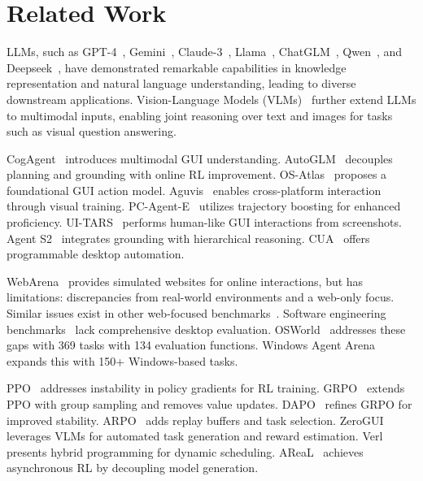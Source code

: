 \clearpage
\section{Related Work}

LLMs, such as GPT-4~\citep{achiam2023gpt}, Gemini~\citep{team2023gemini}, Claude-3~\citep{claude2}, Llama~\citep{touvron2023llama}, ChatGLM~\citep{zeng2022glm,du2022glm}, Qwen~\citep{bai2023qwen,team2024qwen2}, and Deepseek~\citep{liu2024deepseek,guo2025deepseek}, have demonstrated remarkable capabilities in knowledge representation and natural language understanding, leading to diverse downstream applications.
Vision-Language Models (VLMs)~\citep{hong2023cogagent,hong2025glm,bai2023qwen-vl,hurst2024gpt} further extend LLMs to multimodal inputs, enabling joint reasoning over text and images for tasks such as visual question answering.

CogAgent~\citep{hong2023cogagent} introduces multimodal GUI understanding. AutoGLM~\citep{liu2024autoglm} decouples planning and grounding with online RL improvement. OS-Atlas~\citep{wu2024atlas} proposes a foundational GUI action model. Aguvis~\citep{xu2024aguvis} enables cross-platform interaction through visual training. PC-Agent-E~\citep{he2025efficient} utilizes trajectory boosting for enhanced proficiency. UI-TARS~\citep{qin2025ui} performs human-like GUI interactions from screenshots. Agent S2~\citep{agashe2025agent} integrates grounding with hierarchical reasoning. CUA~\citep{cua2025} offers programmable desktop automation.

WebArena~\citep{zhou2023webarena} provides simulated websites for online interactions, but has limitations: discrepancies from real-world environments and a web-only focus. Similar issues exist in other web-focused benchmarks~\citep{yao2022webshop,koh2024visualwebarena,chezelles2024browsergym,miyai2025webchorearena}. Software engineering benchmarks~\citep{jimenez2023swe,yang2024swe,li2024devbench,zan2025multi,padigela2025ml} lack comprehensive desktop evaluation.
OSWorld~\citep{xie2024osworld} addresses these gaps with 369 tasks with 134 evaluation functions. Windows Agent Arena~\citep{bonatti2024windows} expands this with 150+ Windows-based tasks.

PPO~\citep{schulman2017proximal} addresses instability in policy gradients for RL training. GRPO~\citep{guo2025deepseek} extends PPO with group sampling and removes value updates. DAPO~\citep{yu2025dapo} refines GRPO for improved stability. ARPO~\citep{lu2025arpo} adds replay buffers and task selection. ZeroGUI~\citep{yang2025zerogui} leverages VLMs for automated task generation and reward estimation. Verl~\citep{sheng2025hybridflow} presents hybrid programming for dynamic scheduling. AReaL~\citep{fu2025areal} achieves asynchronous RL by decoupling model generation.